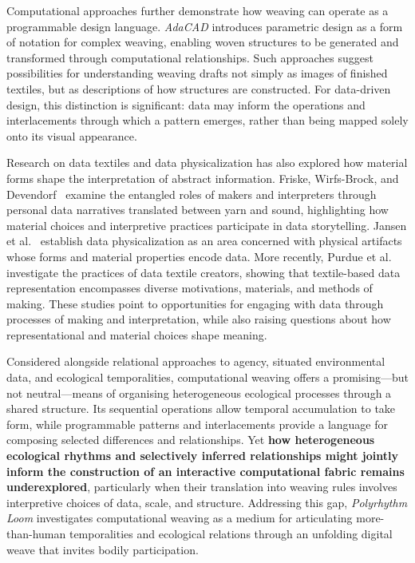 \documentclass[manuscript,review,anonymous]{acmart}
\begin{document}
Computational approaches further demonstrate how weaving can operate as a programmable design language. \emph{AdaCAD} \cite{devendorf2023} introduces parametric design as a form of notation for complex weaving, enabling woven structures to be generated and transformed through computational relationships. Such approaches suggest possibilities for understanding weaving drafts not simply as images of finished textiles, but as descriptions of how structures are constructed. For data-driven design, this distinction is significant: data may inform the operations and interlacements through which a pattern emerges, rather than being mapped solely onto its visual appearance.

Research on data textiles and data physicalization has also explored how material forms shape the interpretation of abstract information. Friske, Wirfs-Brock, and Devendorf~\cite{friske2020} examine the entangled roles of makers and interpreters through personal data narratives translated between yarn and sound, highlighting how material choices and interpretive practices participate in data storytelling. Jansen et al.~\cite{jansen2015} establish data physicalization as an area concerned with physical artifacts whose forms and material properties encode data. More recently, Purdue et al.~\cite{purdue2026} investigate the practices of data textile creators, showing that textile-based data representation encompasses diverse motivations, materials, and methods of making. These studies point to opportunities for engaging with data through processes of making and interpretation, while also raising questions about how representational and material choices shape meaning.

Considered alongside relational approaches to agency, situated environmental data, and ecological temporalities, computational weaving offers a promising—but not neutral—means of organising heterogeneous ecological processes through a shared structure. Its sequential operations allow temporal accumulation to take form, while programmable patterns and interlacements provide a language for composing selected differences and relationships. Yet \textbf{how heterogeneous ecological rhythms and selectively inferred relationships might jointly inform the construction of an interactive computational fabric remains underexplored}, particularly when their translation into weaving rules involves interpretive choices of data, scale, and structure. Addressing this gap, \emph{Polyrhythm Loom} investigates computational weaving as a medium for articulating more-than-human temporalities and ecological relations through an unfolding digital weave that invites bodily participation.
\end{document}

